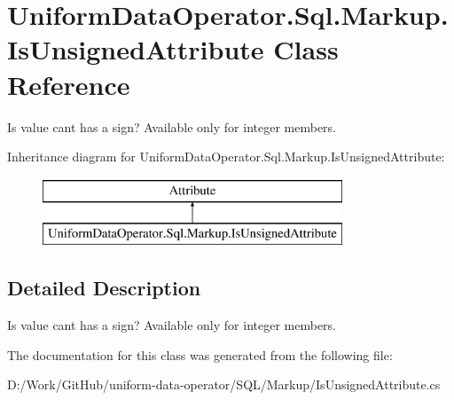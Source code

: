 \hypertarget{class_uniform_data_operator_1_1_sql_1_1_markup_1_1_is_unsigned_attribute}{}\section{Uniform\+Data\+Operator.\+Sql.\+Markup.\+Is\+Unsigned\+Attribute Class Reference}
\label{class_uniform_data_operator_1_1_sql_1_1_markup_1_1_is_unsigned_attribute}


Is value can\textquotesingle{}t has a sign? Available only for integer members.  


Inheritance diagram for Uniform\+Data\+Operator.\+Sql.\+Markup.\+Is\+Unsigned\+Attribute\+:\begin{figure}[H]
\begin{center}
\leavevmode
\includegraphics[height=2.000000cm]{d6/d2f/class_uniform_data_operator_1_1_sql_1_1_markup_1_1_is_unsigned_attribute}
\end{center}
\end{figure}


\subsection{Detailed Description}
Is value can\textquotesingle{}t has a sign? Available only for integer members. 



The documentation for this class was generated from the following file\+:\begin{DoxyCompactItemize}
\item 
D\+:/\+Work/\+Git\+Hub/uniform-\/data-\/operator/\+S\+Q\+L/\+Markup/Is\+Unsigned\+Attribute.\+cs\end{DoxyCompactItemize}
